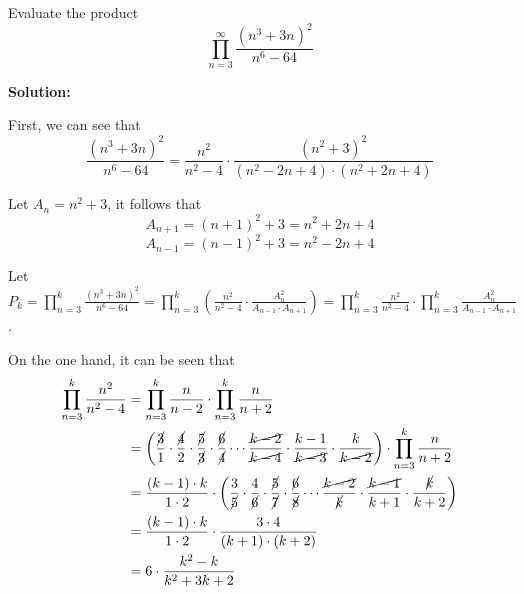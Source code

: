 \documentclass[../../main.tex]{subfiles}
\begin{document}
  \begin{shaded}
    Evaluate the product
    $$
    \prod_{n = 3}^\infty \frac{(n^3 + 3n)^2}{n^6 - 64}
    $$
  \end{shaded}

  \textbf{Solution:}

  First, we can see that
  $$
  \frac{(n^3 + 3n)^2}{n^6 - 64} = \frac{n^2}{n^2 - 4} \cdot \frac{(n^2 + 3)^2}{(n^2 - 2n + 4) \cdot (n^2 + 2n + 4)}
  $$

  Let $A_n = n^2 + 3$, it follows that
  $$
  A_{n + 1} = (n + 1)^2 + 3 = n^2 + 2n + 4
  $$
  $$
  A_{n - 1} = (n - 1)^2 + 3 = n^2 - 2n + 4
  $$

  Let $P_k = \displaystyle\prod_{n = 3}^k \displaystyle\frac{(n^3 + 3n)^2}{n^6 - 64} = \displaystyle\prod_{n = 3}^k \left(\displaystyle\frac{n^2}{n^2 - 4} \cdot \displaystyle\frac{A_n^2}{A_{n - 1} \cdot A_{n + 1}}\right) = \displaystyle\prod_{n = 3}^k \displaystyle\frac{n^2}{n^2 - 4} \cdot \displaystyle\prod_{n = 3}^k \displaystyle\frac{A_n^2}{A_{n - 1} \cdot A_{n + 1}}$.

  On the one hand, it can be seen that
  \begin{equation*}
    \begin{split}
      \prod_{n = 3}^k \frac{n^2}{n^2 - 4} & =
      \prod_{n = 3}^k \frac{n}{n - 2} \cdot \prod_{n = 3}^k \frac{n}{n + 2} \\ & =
      \left(\frac{\cancel{3}}{1} \cdot \frac{\cancel{4}}{2} \cdot \frac{\cancel{5}}{\cancel{3}} \cdot \frac{\cancel{6}}{\cancel{4}} \cdots \frac{\cancel{k - 2}}{\cancel{k - 4}} \cdot \frac{k - 1}{\cancel{k - 3}} \cdot \frac{k}{\cancel{k - 2}} \right) \cdot \prod_{n = 3}^k \frac{n}{n + 2} \\ & =
      \frac{(k - 1) \cdot k}{1 \cdot 2} \cdot \left(\frac{3}{\cancel{5}} \cdot \frac{4}{\cancel{6}} \cdot \frac{\cancel{5}}{\cancel{7}} \cdot \frac{\cancel{6}}{\cancel{8}} \cdots \frac{\cancel{k - 2}}{\cancel{k}} \cdot \frac{\cancel{k - 1}}{k + 1} \cdot \frac{\cancel{k }}{k + 2} \right) \\ & =
      \frac{(k - 1) \cdot k}{1 \cdot 2} \cdot \frac{3 \cdot 4}{(k + 1) \cdot (k + 2)} \\ & =
      6 \cdot \frac{k^2 - k}{k^2 + 3k + 2}
    \end{split}
  \end{equation*}
\end{document}
